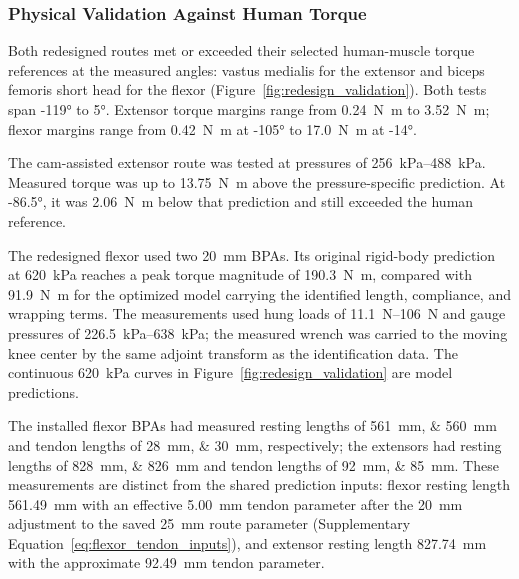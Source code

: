 \documentclass[utf8]{FrontiersinHarvard} %
\begin{document}
\subsubsection{Physical Validation Against Human Torque}

Both redesigned routes met or exceeded their selected human-muscle torque references at the measured angles: vastus medialis for the extensor and biceps femoris short head for the flexor (Figure~\ref{fig:redesign_validation}). Both tests span \ang{-119} to \ang{5}. Extensor torque margins range from \qty{0.24}{\newton\meter} to \qty{3.52}{\newton\meter}; flexor margins range from \qty{0.42}{\newton\meter} at \ang{-105} to \qty{17.0}{\newton\meter} at \ang{-14}.

The cam-assisted extensor route was tested at pressures of \qtyrange{256}{488}{\kPa}. Measured torque was up to \qty{13.75}{\newton\meter} above the pressure-specific prediction. At \ang{-86.5}, it was \qty{2.06}{\newton\meter} below that prediction and still exceeded the human reference.

The redesigned flexor used two \qty{20}{\mm} BPAs. Its original rigid-body prediction at \qty{620}{\kPa} reaches a peak torque magnitude of \qty{190.3}{\newton\meter}, compared with \qty{91.9}{\newton\meter} for the optimized model carrying the identified length, compliance, and wrapping terms. The measurements used hung loads of \qtyrange{11.1}{106}{\newton} and gauge pressures of \qtyrange{226.5}{638}{\kPa}; the measured wrench was carried to the moving knee center by the same adjoint transform as the identification data. The continuous \qty{620}{\kPa} curves in Figure~\ref{fig:redesign_validation} are model predictions.

The installed flexor BPAs had measured resting lengths of \qtylist{561;560}{\mm} and tendon lengths of \qtylist{28;30}{\mm}, respectively; the extensors had resting lengths of \qtylist{828;826}{\mm} and tendon lengths of \qtylist{92;85}{\mm}. These measurements are distinct from the shared prediction inputs: flexor resting length \qty{561.49}{\mm} with an effective \qty{5.00}{\mm} tendon parameter after the \qty{20}{\mm} adjustment to the saved \qty{25}{\mm} route parameter (Supplementary Equation~\eqref{eq:flexor_tendon_inputs}), and extensor resting length \qty{827.74}{\mm} with the approximate \qty{92.49}{\mm} tendon parameter.
\end{document}
